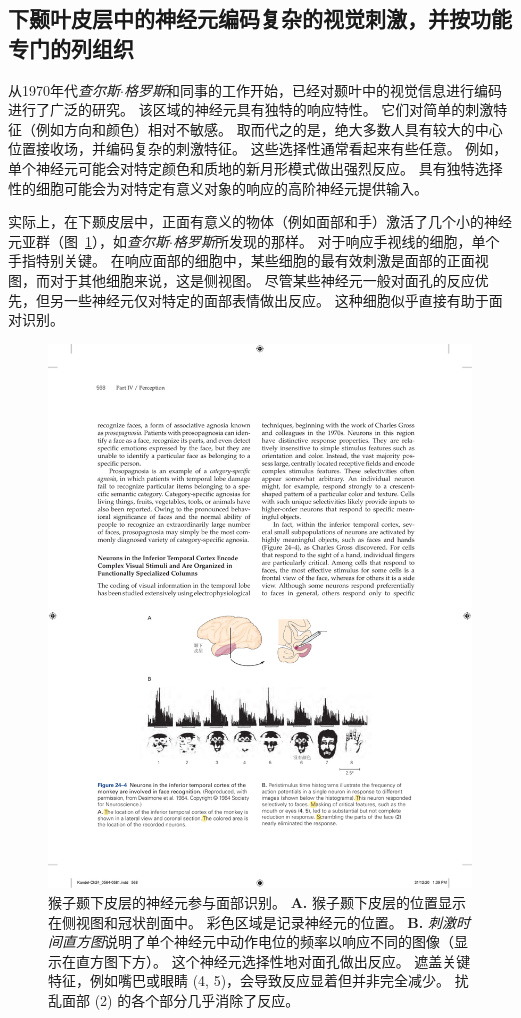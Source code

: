 \subsection{下颞叶皮层中的神经元编码复杂的视觉刺激，并按功能专门的列组织}

从1970年代\textit{查尔斯$\cdot$格罗斯}和同事的工作开始，已经对颞叶中的视觉信息进行编码进行了广泛的研究。
该区域的神经元具有独特的响应特性。
它们对简单的刺激特征（例如方向和颜色）相对不敏感。 
取而代之的是，绝大多数人具有较大的中心位置接收场，并编码复杂的刺激特征。
这些选择性通常看起来有些任意。
例如，单个神经元可能会对特定颜色和质地的新月形模式做出强烈反应。
具有独特选择性的细胞可能会为对特定有意义对象的响应的高阶神经元提供输入。


实际上，在下颞皮层中，正面有意义的物体（例如面部和手）激活了几个小的神经元亚群（图~\ref{fig:24_4}），如\textit{查尔斯$\cdot$格罗斯}所发现的那样。
对于响应手视线的细胞，单个手指特别关键。
在响应面部的细胞中，某些细胞的最有效刺激是面部的正面视图，而对于其他细胞来说，这是侧视图。
尽管某些神经元一般对面孔的反应优先，但另一些神经元仅对特定的面部表情做出反应。
这种细胞似乎直接有助于面对识别。


\begin{figure}[htbp]
	\centering
	\includegraphics[width=0.8\linewidth]{chap24/fig_24_4}
	\caption{猴子颞下皮层的神经元参与面部识别。
		\textbf{A.} 猴子颞下皮层的位置显示在侧视图和冠状剖面中。 彩色区域是记录神经元的位置。 
		\textbf{B.} \textit{刺激时间直方图}说明了单个神经元中动作电位的频率以响应不同的图像（显示在直方图下方）。
		这个神经元选择性地对面孔做出反应。
		遮盖关键特征，例如嘴巴或眼睛 (4, 5)，会导致反应显着但并非完全减少。
		扰乱面部 (2) 的各个部分几乎消除了反应。}
	\label{fig:24_4}
\end{figure}


